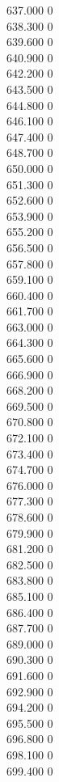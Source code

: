 { 637.000	0 \\
 638.300	0 \\
 639.600	0 \\
 640.900	0 \\
 642.200	0 \\
 643.500	0 \\
 644.800	0 \\
 646.100	0 \\
 647.400	0 \\
 648.700	0 \\
 650.000	0 \\
 651.300	0 \\
 652.600	0 \\
 653.900	0 \\
 655.200	0 \\
 656.500	0 \\
 657.800	0 \\
 659.100	0 \\
 660.400	0 \\
 661.700	0 \\
 663.000	0 \\
 664.300	0 \\
 665.600	0 \\
 666.900	0 \\
 668.200	0 \\
 669.500	0 \\
 670.800	0 \\
 672.100	0 \\
 673.400	0 \\
 674.700	0 \\
 676.000	0 \\
 677.300	0 \\
 678.600	0 \\
 679.900	0 \\
 681.200	0 \\
 682.500	0 \\
 683.800	0 \\
 685.100	0 \\
 686.400	0 \\
 687.700	0 \\
 689.000	0 \\
 690.300	0 \\
 691.600	0 \\
 692.900	0 \\
 694.200	0 \\
 695.500	0 \\
 696.800	0 \\
 698.100	0 \\
 699.400	0 \\
}
